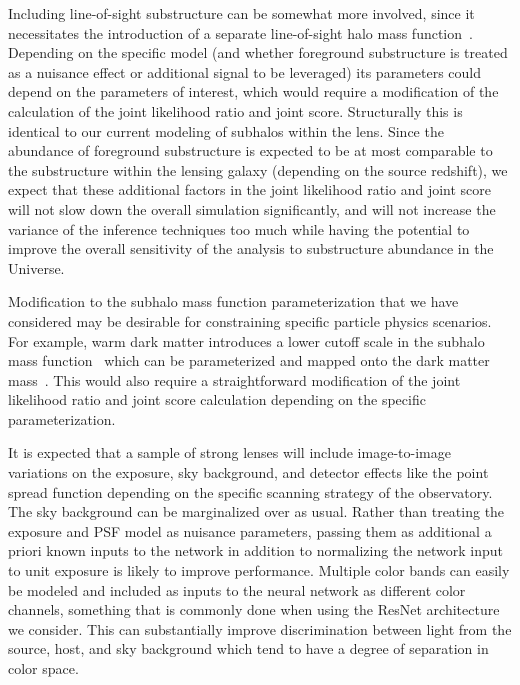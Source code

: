 \documentclass[twocolumn]{aastex63}
\begin{document}
Including line-of-sight substructure can be somewhat more involved, since it necessitates the introduction of a separate line-of-sight halo mass function~\citep{1610.01599,1710.05029,1901.11031,2019arXiv190504182H}. Depending on the specific model (and whether foreground substructure is treated as a nuisance effect or additional signal to be leveraged) its parameters could depend on the parameters of interest, which would require a modification of the calculation of the joint likelihood ratio and joint score. Structurally this is identical to our current modeling of subhalos within the lens. Since the abundance of foreground substructure is expected to be at most comparable to the substructure within the lensing galaxy (depending on the source redshift), we expect that these additional factors in the joint likelihood ratio and joint score will not slow down the overall simulation significantly, and will not increase the variance of the inference techniques too much while having the potential to improve the overall sensitivity of the analysis to substructure abundance in the Universe.

Modification to the subhalo mass function parameterization that we have considered may be desirable for constraining specific particle physics scenarios. For example, warm dark matter introduces a lower cutoff scale in the subhalo mass function~\citep{2001ApJ...556...93B} which can be parameterized and mapped onto the dark matter mass~\citep{1112.0330,1308.1399,1512.06507,1702.00009}. This would also require a straightforward modification of the joint likelihood ratio and joint score calculation depending on the specific parameterization.

It is expected that a sample of strong lenses will include image-to-image variations on the exposure, sky background, and detector effects like the point spread function depending on the specific scanning strategy of the observatory. The sky background can be marginalized over as usual. Rather than treating the exposure and PSF model as nuisance parameters, passing them as additional a priori known inputs to the network in addition to normalizing the network input to unit exposure is likely to improve performance. Multiple color bands can easily be modeled and included as inputs to the neural network as different color channels, something that is commonly done when using the ResNet architecture we consider. This can substantially improve discrimination between light from the source, host, and sky background which tend to have a degree of separation in color space.
\end{document}
